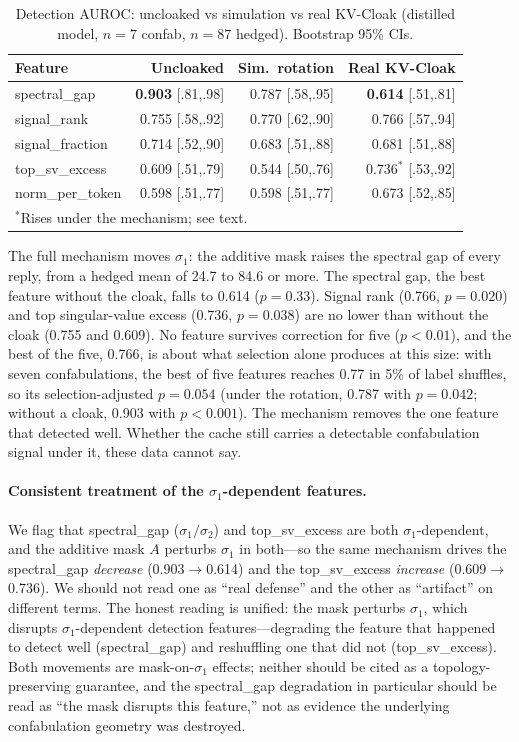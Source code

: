 \begin{table}[h]
\centering
\caption{Detection AUROC: uncloaked vs simulation vs real KV-Cloak
(distilled model, $n=7$ confab, $n=87$ hedged). Bootstrap 95\% CIs.}
\label{tab:real_vs_sim}
\begin{tabular}{lrrr}
\toprule
Feature & Uncloaked & Sim.\ rotation & Real KV-Cloak \\
\midrule
spectral\_gap & \textbf{0.903} [.81,.98] & 0.787 [.58,.95] & \textbf{0.614} [.51,.81] \\
signal\_rank & 0.755 [.58,.92] & 0.770 [.62,.90] & 0.766 [.57,.94] \\
signal\_fraction & 0.714 [.52,.90] & 0.683 [.51,.88] & 0.681 [.51,.88] \\
top\_sv\_excess & 0.609 [.51,.79] & 0.544 [.50,.76] & 0.736$^*$ [.53,.92] \\
norm\_per\_token & 0.598 [.51,.77] & 0.598 [.51,.77] & 0.673 [.52,.85] \\
\bottomrule
\multicolumn{4}{l}{\footnotesize $^*$Rises under the mechanism; see text.}
\end{tabular}
\end{table}

The full mechanism moves $\sigma_1$: the additive mask raises the spectral
gap of every reply, from a hedged mean of 24.7 to 84.6 or more. The
spectral gap, the best feature without the cloak, falls to 0.614
($p = 0.33$). Signal rank (0.766, $p = 0.020$) and top singular-value
excess (0.736, $p = 0.038$) are no lower than without the cloak (0.755 and
0.609). No feature survives correction for five ($p < 0.01$), and the best
of the five, 0.766, is about what selection alone produces at this size:
with seven confabulations, the best of five features reaches 0.77 in 5\%
of label shuffles, so its selection-adjusted $p = 0.054$ (under the
rotation, 0.787 with $p = 0.042$; without a cloak, 0.903 with
$p < 0.001$). The mechanism removes the one feature that detected well.
Whether the cache still carries a detectable confabulation signal under
it, these data cannot say.

\paragraph{Consistent treatment of the $\sigma_1$-dependent features.}
We flag that spectral\_gap ($\sigma_1/\sigma_2$) and top\_sv\_excess are
both $\sigma_1$-dependent, and the additive mask $A$ perturbs $\sigma_1$
in both---so the same mechanism drives the spectral\_gap \emph{decrease}
(0.903$\to$0.614) and the top\_sv\_excess \emph{increase} (0.609$\to$0.736).
We should not read one as ``real defense'' and the other as ``artifact''
on different terms. The honest reading is unified: the mask perturbs
$\sigma_1$, which disrupts $\sigma_1$-dependent detection
features---degrading the feature that happened to detect well
(spectral\_gap) and reshuffling one that did not (top\_sv\_excess). Both
movements are mask-on-$\sigma_1$ effects; neither should be cited as a
topology-preserving guarantee, and the spectral\_gap degradation in
particular should be read as ``the mask disrupts this feature,'' not as
evidence the underlying confabulation geometry was destroyed.

